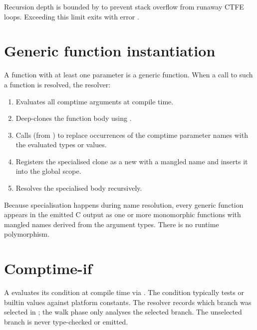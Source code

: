 \pnum
Recursion depth is bounded by  to prevent
stack overflow from runaway CTFE loops.  Exceeding this limit exits with
error .

\section{Generic function instantiation}
\label{sec:ct-generics}

\pnum
A function with at least one  parameter is a generic function.
When a call to such a function is resolved, the resolver:
\begin{enumerate}
\item Evaluates all comptime arguments at compile time.
\item Deep-clones the function body using .
\item Calls  (from )
  to replace occurrences of the comptime parameter names with the evaluated
  types or values.
\item Registers the specialised clone as a new  with a
  mangled name and inserts it into the global scope.
\item Resolves the specialised body recursively.
\end{enumerate}

\pnum
Because specialisation happens during name resolution, every generic function
appears in the emitted C output as one or more monomorphic functions with
mangled names derived from the argument types.  There is no runtime
polymorphism.

\section{Comptime-if}
\label{sec:ct-if}

\pnum
A  evaluates its condition at compile time via
.  The condition typically tests 
or  builtin values against platform constants.  The resolver
records which branch was selected in ; the
walk phase only analyses the selected branch.  The unselected branch is
never type-checked or emitted.

